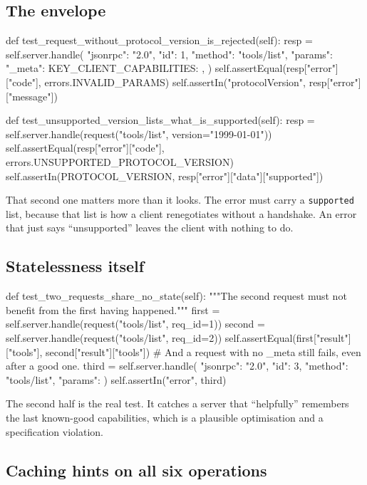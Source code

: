 \subsection{The envelope}

\begin{py}
def test_request_without_protocol_version_is_rejected(self):
    resp = self.server.handle({
        "jsonrpc": "2.0", "id": 1, "method": "tools/list",
        "params": {"_meta": {KEY_CLIENT_CAPABILITIES: {}}},
    })
    self.assertEqual(resp["error"]["code"], errors.INVALID_PARAMS)
    self.assertIn("protocolVersion", resp["error"]["message"])

def test_unsupported_version_lists_what_is_supported(self):
    resp = self.server.handle(request("tools/list", version="1999-01-01"))
    self.assertEqual(resp["error"]["code"], errors.UNSUPPORTED_PROTOCOL_VERSION)
    self.assertIn(PROTOCOL_VERSION, resp["error"]["data"]["supported"])
\end{py}

That second one matters more than it looks. The error must carry a
\texttt{supported} list, because that list is how a client renegotiates without
a handshake. An error that just says ``unsupported'' leaves the client with
nothing to do.

\subsection{Statelessness itself}

\begin{py}
def test_two_requests_share_no_state(self):
    """The second request must not benefit from the first having happened."""
    first = self.server.handle(request("tools/list", req_id=1))
    second = self.server.handle(request("tools/list", req_id=2))
    self.assertEqual(first["result"]["tools"], second["result"]["tools"])
    # And a request with no _meta still fails, even after a good one.
    third = self.server.handle(
        {"jsonrpc": "2.0", "id": 3, "method": "tools/list", "params": {}})
    self.assertIn("error", third)
\end{py}

The second half is the real test. It catches a server that ``helpfully''
remembers the last known-good capabilities, which is a plausible optimisation
and a specification violation.

\subsection{Caching hints on all six operations}

